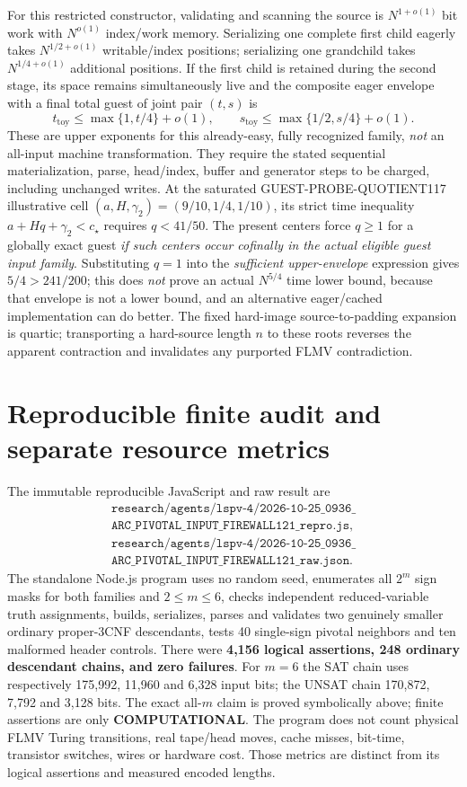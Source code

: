 \documentclass[11pt]{article}
\begin{document}
For this restricted constructor, validating and scanning the
source is $N^{1+o(1)}$ bit work with $N^{o(1)}$ index/work
memory. Serializing one complete first child eagerly takes
$N^{1/2+o(1)}$ writable/index positions; serializing one
grandchild takes $N^{1/4+o(1)}$ additional positions.
If the first child is retained during the second stage,
its space remains simultaneously live and the composite
eager envelope with a final total guest of joint pair $(t,s)$ is
\[
 t_{\mathrm{toy}}\le \max\{1,t/4\}+o(1),\qquad
 s_{\mathrm{toy}}\le \max\{1/2,s/4\}+o(1).
\]
These are upper exponents for this already-easy,
fully recognized family, \emph{not} an all-input
machine transformation. They require the stated sequential
materialization, parse, head/index, buffer and generator
steps to be charged, including unchanged writes.
At the saturated GUEST-PROBE-QUOTIENT117 illustrative
cell $(a,H,\gamma_2)=(9/10,1/4,1/10)$,
its strict time inequality $a+Hq+\gamma_2<c_\star$
requires $q<41/50$. The present centers force $q\ge1$
for a globally exact guest \emph{if such centers occur
cofinally in the actual eligible guest input family}.
Substituting $q=1$ into the \emph{sufficient upper-envelope}
expression gives $5/4>241/200$; this does \emph{not}
prove an actual $N^{5/4}$ time lower bound, because
that envelope is not a lower bound, and an alternative
eager/cached implementation can do better.
The fixed hard-image source-to-padding expansion
is quartic; transporting a hard-source length $n$
to these roots reverses the apparent contraction and
invalidates any purported FLMV contradiction.

\section{Reproducible finite audit and separate resource metrics}
The immutable reproducible JavaScript and raw result are
\[
\begin{gathered}
\texttt{research/agents/lspv-4/2026-10-25\_0936\_}\\
\texttt{ARC\_PIVOTAL\_INPUT\_FIREWALL121\_repro.js},\\
\texttt{research/agents/lspv-4/2026-10-25\_0936\_}\\
\texttt{ARC\_PIVOTAL\_INPUT\_FIREWALL121\_raw.json}.
\end{gathered}
\]
The standalone Node.js program uses no random seed, enumerates
all $2^m$ sign masks for both families and $2\le m\le6$,
checks independent reduced-variable truth assignments, builds,
serializes, parses and validates two genuinely smaller ordinary
proper-3CNF descendants, tests 40 single-sign pivotal
neighbors and ten malformed header controls.
There were \textbf{4,156 logical assertions, 248
ordinary descendant chains, and zero failures}.
For $m=6$ the SAT chain uses respectively
175,992, 11,960 and 6,328 input bits; the UNSAT chain
170,872, 7,792 and 3,128 bits. The exact all-$m$
claim is proved symbolically above; finite assertions
are only \textbf{COMPUTATIONAL}.
The program does not count physical FLMV Turing transitions,
real tape/head moves, cache misses, bit-time, transistor
switches, wires or hardware cost. Those metrics are distinct
from its logical assertions and measured encoded lengths.
\end{document}
